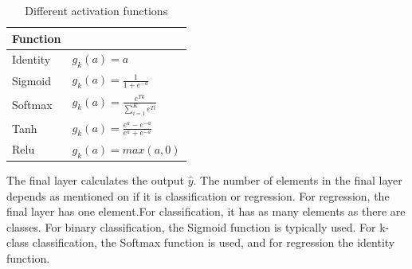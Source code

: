         
        
    \begin{table}[h]
        \centering
        \begin{tabular}{l l}
            \toprule
            \textbf{Function} & \\ \midrule
            Identity & $g_k(a) =a$ \\ 
            Sigmoid & $g_k(a) =\frac{1}{1+e^{-a}}$ \\ 
            Softmax & $g_k(a) =\frac{e^{Tk}}{\sum_{i=1}^Ke^{Ti}}$ \\ 
            Tanh & $g_k(a) =\frac{e^a-e^{-a}}{e^a+e^{-a}}$ \\ 
            Relu & $g_k(a) =max(a,0)$ \\ \bottomrule
        \end{tabular}
        \caption{Different activation functions}
        \label{tab:acitvations}
    \end{table}
        The final layer calculates the output $\hat y$. The number of elements in the final layer depends as mentioned on if it is classification or regression. For regression, the final layer has one element.For classification, it has as many elements as there are classes. For binary classification, the Sigmoid function is typically used. For k-class classification, the Softmax function is used, and for regression the identity function.
        
